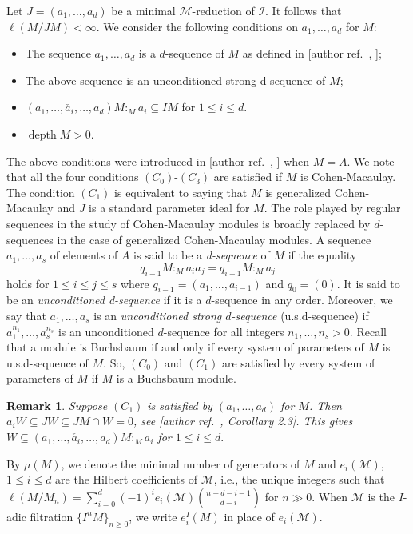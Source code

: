 \documentclass[10pt,a4paper]{amsart}
\def\I{{\mathcal I}}
\def\M{{\mathcal M}}
\DeclareMathOperator{\depth}{depth}
\newtheorem{remark}{Remark}
\renewcommand{\cite}[2][]{\textup{[author ref.\ \texttt{\detokenize{#2}}\if\relax\detokenize{#1}\relax\else, #1\fi]}}
\begin{document}
Let $J=(a_1,\ldots,a_d)$ be a minimal $\M$-reduction of $\I$. 
It follows that $\ell(M/JM)<\infty.$ We consider the following conditions on $a_1,\ldots,a_d$ for $M$: 
	\begin{itemize}
	\item[$(C_0)$] The sequence $a_1,\ldots,a_d$ is a $d$-sequence of $M$ as defined in \cite{adt};
	\item[$(C_1)$] The above sequence is an unconditioned strong d-sequence of $M$;
	\item[$(C_2)$]  $(a_1,\ldots, \check{a_i},\ldots,a_d)M:_Ma_i\subseteq IM$   for $1\leq i\leq d$.
	\item[$(C_3)$] $\depth  M>0$.
\end{itemize}
The above conditions were introduced in \cite{ozeki13} when $M=A$. We note that
all the four conditions $(C_0)$-$(C_3)$ are satisfied if $M$ is Cohen-Macaulay. The condition $(C_1)$ is equivalent to saying that $M$ is generalized Cohen-Macaulay and $J$ is a standard parameter ideal for $M$. The role played by regular sequences in the study of Cohen-Macaulay modules is broadly replaced
by $d$-sequences in the case of generalized Cohen-Macaulay modules. 
A sequence $a_1,\ldots,a_s$ of elements of $A$ is said to be a {\textit{d-sequence}} of $M$ if the equality 
\[q_{i-1}M:_M a_ia_j=q_{i-1}M:_M a_j\] holds for $1\leq i\leq j\leq s$ where 
$q_{i-1}=(a_1,\ldots,a_{i-1})$ and $q_0=(0)$. It is said to be an {\textit{unconditioned d-sequence}} if it is a $d$-sequence in any order. Moreover, we say that $a_1,\ldots,a_s$ is an {\textit{unconditioned strong $d$-sequence}} (u.s.d-sequence) if $a_1^{n_1},\ldots,a_s^{n_s}$ is an  unconditioned $d$-sequence for  all integers $n_1,\ldots,n_s>0$. 
Recall that a module is Buchsbaum if and only if every system of parameters of $M$ is u.s.d-sequence of $M$. So,  $(C_0)$ and $(C_1)$ are satisfied by every system of parameters of $M$ if $M$ is a Buchsbaum module. 


\begin{remark}\label{remark-nota}
Suppose  $(C_1)$ is satisfied by $(a_1,\ldots,a_d)$ for $M$. Then $a_i W\subseteq JW\subseteq JM\cap W=0$,  see \cite[Corollary 2.3]{trung-gcm}. This gives 
$ W\subseteq (a_1,\ldots, \check{a_i},\ldots,a_d)M:_Ma_i$ for $1\leq i\leq d.$
\end{remark}

By $\mu(M)$, we denote the minimal number of generators of $M$ and $e_i(\M)$, $1\leq i\leq d$ are the Hilbert coefficients of $\M$, i.e., the unique integers such that $\ell(M/M_n)=\sum\limits_{i=0}^d(-1)^ie_i(\M)\binom{n+d-i-1}{d-i}$ for $n\gg 0.$ When $\M$ is the $I$-adic filtration $\{I^nM\}_{n\geq 0}$, we write $e_i^I(M)$ in place of $e_i(\M)$. 
\end{document}
